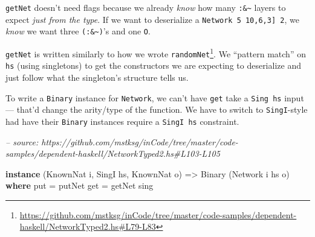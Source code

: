 \documentclass[]{article}
\newenvironment{Shaded}{}{}
\newcommand{\CommentTok}[1]{\textcolor[rgb]{0.38,0.63,0.69}{\textit{#1}}}
\newcommand{\DataTypeTok}[1]{\textcolor[rgb]{0.56,0.13,0.00}{#1}}
\newcommand{\FunctionTok}[1]{\textcolor[rgb]{0.02,0.16,0.49}{#1}}
\newcommand{\KeywordTok}[1]{\textcolor[rgb]{0.00,0.44,0.13}{\textbf{#1}}}
\newcommand{\NormalTok}[1]{#1}
\newcommand{\OtherTok}[1]{\textcolor[rgb]{0.00,0.44,0.13}{#1}}
\renewcommand{\href}[2]{#2\footnote{\url{#1}}}
\begin{document}
\begin{Shaded}
\end{Shaded}

\texttt{getNet} doesn't need flags because we already \emph{know} how many
\texttt{:\&\textasciitilde{}} layers to expect \emph{just from the type}. If we
want to deserialize a \texttt{Network\ 5\ \textquotesingle{}{[}10,6,3{]}\ 2}, we
\emph{know} we want three \texttt{(:\&\textasciitilde{})}'s and one \texttt{O}.

\texttt{getNet} is written similarly to how we wrote
\href{https://github.com/mstksg/inCode/tree/master/code-samples/dependent-haskell/NetworkTyped2.hs\#L79-L83}{\texttt{randomNet\textquotesingle{}}}.
We ``pattern match'' on \texttt{hs} (using singletons) to get the constructors
we are expecting to deserialize and just follow what the singleton's structure
tells us.

To write a \texttt{Binary} instance for \texttt{Network}, we can't have
\texttt{get} take a \texttt{Sing\ hs} input --- that'd change the arity/type of
the function. We have to switch to \texttt{SingI}-style had have their
\texttt{Binary} instances require a \texttt{SingI\ hs} constraint.

\begin{Shaded}
\begin{Highlighting}[]
\CommentTok{-- source: https://github.com/mstksg/inCode/tree/master/code-samples/dependent-haskell/NetworkTyped2.hs#L103-L105}

\KeywordTok{instance}\NormalTok{ (}\DataTypeTok{KnownNat}\NormalTok{ i, }\DataTypeTok{SingI}\NormalTok{ hs, }\DataTypeTok{KnownNat}\NormalTok{ o) }\OtherTok{=>} \DataTypeTok{Binary}\NormalTok{ (}\DataTypeTok{Network}\NormalTok{ i hs o) }\KeywordTok{where}
\NormalTok{    put }\FunctionTok{=}\NormalTok{ putNet}
\NormalTok{    get }\FunctionTok{=}\NormalTok{ getNet sing}
\end{Highlighting}
\end{Shaded}
\end{document}
